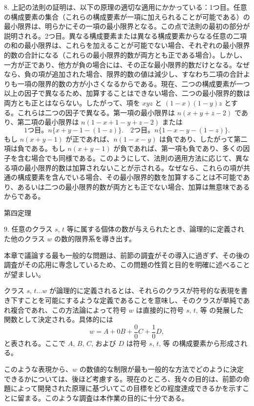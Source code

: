 \documentclass[a4paper,11pt,openany]{ltjsbook}
\begin{document}
8. 上記の法則の証明は、以下の原理の適切な適用にかかっている：1つ目。任意の構成要素の集合（これらの構成要素が一項に加えられることが可能である）の最小限界は、明らかにその一項の最小限界となる。この点で法則の最初の部分が説明される。2つ目。異なる構成要素または異なる構成要素からなる任意の二項の和の最小限界は、これらを加えることが可能でない場合、それぞれの最小限界的数の合計になる（これらの最小限界的数が両方とも正である場合）。しかし、一方が正であり、他方が負の場合には、その正な最小限界的数だけとなる。なぜなら、負の項が追加された場合、限界的数の値は減少し、すなわち二項の合計よりも一項の限界的数の方が小さくなるからである。現在、二つの構成要素が一つ以上の因子で異なるため、加算することはできない場合、二つの最小限界的数は両方とも正とはならない。したがって、項を $xyz$ と $(1-x)(1-y)z$ とする。これらは二つの因子で異なる。第一項の最小限界は $n(x + y + z - 2)$ であり、第二項の最小限界は $n(1 - x + 1 - y + z - 2)$ または
\[
\text{1つ目。} n\{x + y - 1 - (1 - z)\}. \quad \text{2つ目。} n\{1 - x - y - (1 - z)\}.
\]
もし $n(x + y - 1)$ が正であれば、$n(1 - x - y)$ は負であり、したがって第二項は負である。もし $n(x + y - 1)$ が負であれば、第一項も負であり、多くの因子を含む場合でも同様である。このようにして、法則の適用方法に応じて、異なる項の最小限界的数は加算されないことが示される。なぜなら、これらの項が共通の構成要素を含んでいる場合、その最小限界的数を加算することは不可能であり、あるいは二つの最小限界的数が両方とも正でない場合、加算は無意味であるからである。

\textsc{第四定理}

9. 任意のクラス $s$, $t$ 等に属する個体の数が与えられたとき、論理的に定義された他のクラス $w$ の数的限界系を導き出す。

本章で議論する最も一般的な問題は、前節の調査がその導入に過ぎず、その後の調査がその応用に専念しているため、この問題の性質と目的を明確に述べることが望ましい。

クラス $s$, $t \dotsc w$ が論理的に定義されるとは、それらのクラスが符号的な表現を書き下すことを可能にするような定義であることを意味し、そのクラスが単純であれ複合であれ、この方法論によって符号 $w$ は直接的に符号 $s$, $t$, 等 の発展した関数として決定される。具体的には
\begin{equation*}
w = A + 0B + \frac{0}{0}C + \frac{1}{0}D,      \tag{1}
\end{equation*}
と表される。ここで $A$, $B$, $C$, および $D$ は符号 $s$, $t$, 等 の構成要素から形成される。

このような表現から、$w$ の数値的な制限が最も一般的な方法でどのように決定できるかについては、後ほど考慮する。現在のところ、我々の目的は、前節の命題によって開発された原理に基づいてこの目標をどの程度達成できるかを示すことに留まる。このような調査は本作業の目的に十分である。
\end{document}
